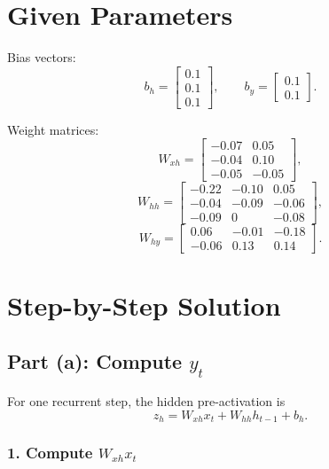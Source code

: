 \documentclass[11pt]{article}
\begin{document}
\section*{Given Parameters}

Bias vectors:
\[
    b_h=\begin{bmatrix}0.1\\0.1\\0.1\end{bmatrix},
    \qquad
    b_y=\begin{bmatrix}0.1\\0.1\end{bmatrix}.
\]

Weight matrices:
\[
    W_{xh}
    =
    \begin{bmatrix}
        -0.07 & 0.05 \\
        -0.04 & 0.10 \\
        -0.05 & -0.05
    \end{bmatrix},
\]
\[
    W_{hh}
    =
    \begin{bmatrix}
        -0.22 & -0.10 & 0.05 \\
        -0.04 & -0.09 & -0.06 \\
        -0.09 & 0 & -0.08
    \end{bmatrix},
\]
\[
    W_{hy}
    =
    \begin{bmatrix}
        0.06 & -0.01 & -0.18 \\
        -0.06 & 0.13 & 0.14
    \end{bmatrix}.
\]

\section*{Step-by-Step Solution}

\subsection*{Part (a): Compute \(y_t\)}

For one recurrent step, the hidden pre-activation is
\[
    z_h = W_{xh}x_t + W_{hh}h_{t-1} + b_h.
\]

\subsubsection*{1. Compute \(W_{xh}x_t\)}
\end{document}
